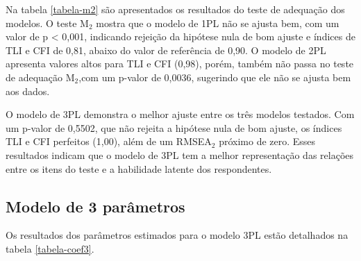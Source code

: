 Na tabela \ref{tabela-m2} são apresentados os resultados do teste de adequação dos modelos. O teste M$_2$ mostra que o modelo de 1PL não se ajusta bem, com um valor de p < 0,001, indicando rejeição da hipótese nula de bom ajuste e índices de TLI e CFI de 0,81, abaixo do valor de referência de 0,90. O modelo de 2PL apresenta valores altos para TLI e CFI (0,98), porém, também não passa no teste de adequação M$_2$,com um p-valor de 0,0036, sugerindo que ele não se ajusta bem aos dados.

O modelo de 3PL demonstra o melhor ajuste entre os três modelos testados. Com um p-valor de 0,5502, que não rejeita a hipótese nula de bom ajuste, os índices TLI e CFI perfeitos (1,00), além de um RMSEA$_2$ próximo de zero. Esses resultados indicam que o modelo de 3PL tem a melhor representação das relações entre os itens do teste e a habilidade latente dos respondentes.


\subsection{Modelo de 3 parâmetros}

Os resultados dos parâmetros estimados para o modelo 3PL estão detalhados na tabela \ref{tabela-coef3}.

